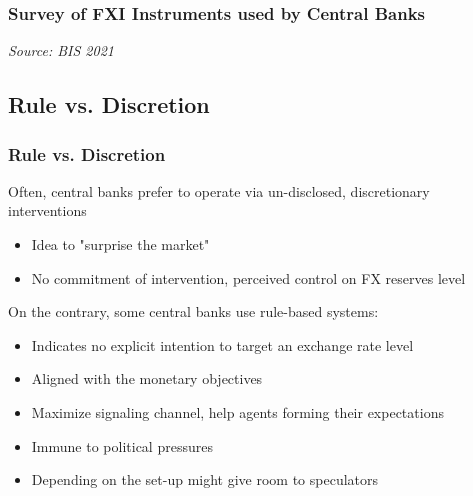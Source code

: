 \documentclass{beamer}
\newenvironment{wideitemize}{\itemize\addtolength{\itemsep}{10pt}}{\enditemize}
\begin{document}
\begin{frame}
\frametitle{Survey of FXI Instruments used by Central Banks}
\medskip
\emph{Source: BIS 2021 \href{https://www.bis.org/publ/bppdf/bispap104b_rh.pdf)}{}}
\end{frame}


\subsection{Rule vs. Discretion}

\begin{frame}
  \frametitle{Rule vs. Discretion}

  \begin{wideitemize}
  \item Often, central banks prefer to operate via un-disclosed, discretionary interventions
    \begin{itemize}
    \item Idea to "surprise the market"
    \item No commitment of intervention, perceived control on FX reserves level
    \end{itemize}
  \item On the contrary, some central banks use rule-based systems:
    \begin{itemize}
    \item Indicates no explicit intention to target an exchange rate level
    \item Aligned with the monetary objectives
    \item Maximize signaling channel, help agents forming their expectations
    \item Immune to political pressures
    \item Depending on the set-up might give room to speculators
    \end{itemize}
  \end{wideitemize}  
\end{frame}
\end{document}
